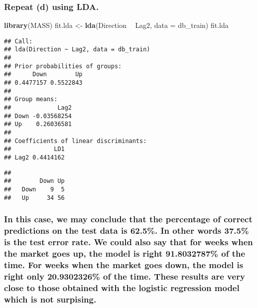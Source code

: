 \documentclass[]{article}
\newenvironment{Shaded}{\begin{snugshade}}{\end{snugshade}}
\newcommand{\KeywordTok}[1]{\textcolor[rgb]{0.13,0.29,0.53}{\textbf{#1}}}
\newcommand{\DataTypeTok}[1]{\textcolor[rgb]{0.13,0.29,0.53}{#1}}
\newcommand{\StringTok}[1]{\textcolor[rgb]{0.31,0.60,0.02}{#1}}
\newcommand{\OperatorTok}[1]{\textcolor[rgb]{0.81,0.36,0.00}{\textbf{#1}}}
\newcommand{\NormalTok}[1]{#1}
\begin{document}
\subsubsection{Repeat (d) using LDA.}\label{repeat-d-using-lda.}

\begin{Shaded}
\begin{Highlighting}[]
\KeywordTok{library}\NormalTok{(MASS)}
\NormalTok{fit.lda <-}\StringTok{ }\KeywordTok{lda}\NormalTok{(Direction }\OperatorTok{~}\StringTok{ }\NormalTok{Lag2, }\DataTypeTok{data =}\NormalTok{ db_train)}
\NormalTok{fit.lda}
\end{Highlighting}
\end{Shaded}

\begin{verbatim}
## Call:
## lda(Direction ~ Lag2, data = db_train)
## 
## Prior probabilities of groups:
##      Down        Up 
## 0.4477157 0.5522843 
## 
## Group means:
##             Lag2
## Down -0.03568254
## Up    0.26036581
## 
## Coefficients of linear discriminants:
##            LD1
## Lag2 0.4414162
\end{verbatim}

\begin{Shaded}
\end{Shaded}

\begin{verbatim}
##       
##        Down Up
##   Down    9  5
##   Up     34 56
\end{verbatim}

\subsubsection{In this case, we may conclude that the percentage of
correct predictions on the test data is 62.5\%. In other words 37.5\% is
the test error rate. We could also say that for weeks when the market
goes up, the model is right 91.8032787\% of the time. For weeks when the
market goes down, the model is right only 20.9302326\% of the time.
These results are very close to those obtained with the logistic
regression model which is not
surpising.}\label{in-this-case-we-may-conclude-that-the-percentage-of-correct-predictions-on-the-test-data-is-62.5.-in-other-words-37.5-is-the-test-error-rate.-we-could-also-say-that-for-weeks-when-the-market-goes-up-the-model-is-right-91.8032787-of-the-time.-for-weeks-when-the-market-goes-down-the-model-is-right-only-20.9302326-of-the-time.-these-results-are-very-close-to-those-obtained-with-the-logistic-regression-model-which-is-not-surpising.}
\end{document}
